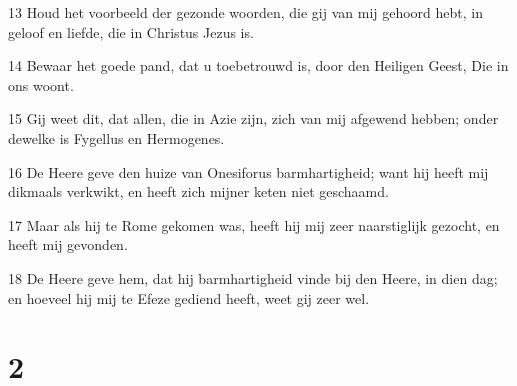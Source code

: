 \par 13 Houd het voorbeeld der gezonde woorden, die gij van mij gehoord hebt, in geloof en liefde, die in Christus Jezus is.
\par 14 Bewaar het goede pand, dat u toebetrouwd is, door den Heiligen Geest, Die in ons woont.
\par 15 Gij weet dit, dat allen, die in Azie zijn, zich van mij afgewend hebben; onder dewelke is Fygellus en Hermogenes.
\par 16 De Heere geve den huize van Onesiforus barmhartigheid; want hij heeft mij dikmaals verkwikt, en heeft zich mijner keten niet geschaamd.
\par 17 Maar als hij te Rome gekomen was, heeft hij mij zeer naarstiglijk gezocht, en heeft mij gevonden.
\par 18 De Heere geve hem, dat hij barmhartigheid vinde bij den Heere, in dien dag; en hoeveel hij mij te Efeze gediend heeft, weet gij zeer wel.

\chapter{2}

